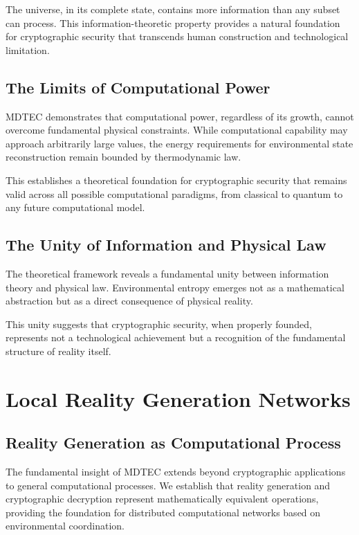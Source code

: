 \documentclass[12pt]{article}
\begin{document}
The universe, in its complete state, contains more information than any subset can process. This information-theoretic property provides a natural foundation for cryptographic security that transcends human construction and technological limitation.

\subsection{The Limits of Computational Power}

MDTEC demonstrates that computational power, regardless of its growth, cannot overcome fundamental physical constraints. While computational capability may approach arbitrarily large values, the energy requirements for environmental state reconstruction remain bounded by thermodynamic law.

This establishes a theoretical foundation for cryptographic security that remains valid across all possible computational paradigms, from classical to quantum to any future computational model.

\subsection{The Unity of Information and Physical Law}

The theoretical framework reveals a fundamental unity between information theory and physical law. Environmental entropy emerges not as a mathematical abstraction but as a direct consequence of physical reality.

This unity suggests that cryptographic security, when properly founded, represents not a technological achievement but a recognition of the fundamental structure of reality itself.

\section{Local Reality Generation Networks}

\subsection{Reality Generation as Computational Process}

The fundamental insight of MDTEC extends beyond cryptographic applications to general computational processes. We establish that reality generation and cryptographic decryption represent mathematically equivalent operations, providing the foundation for distributed computational networks based on environmental coordination.
\end{document}
